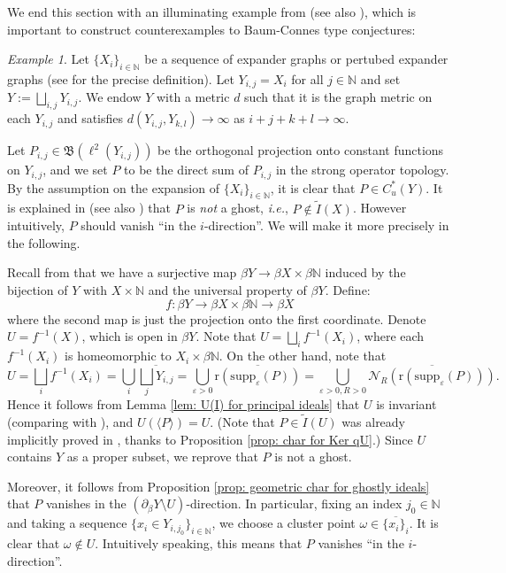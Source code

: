 \documentclass[12pt, a4paper]{amsart}
\numberwithin{equation}{section}
\theoremstyle{definition}
\theoremstyle{remark}
\newtheorem{ex}[thm]{Example}
\def\NN{\mathbb{N}}
\def\Nd{\mathcal{N}}
\def\B{\mathfrak{B}}
\def\supp{\mathrm{supp}}
\def\r{\mathrm{r}}
\begin{document}
We end this section with an illuminating example from \cite[Section 3]{Wan07} (see also \cite[Section 5]{FW14}), which is important to construct counterexamples to Baum-Connes type conjectures:

\begin{ex}\label{ex: Wan07}
Let $\{X_i\}_{i\in \NN}$ be a sequence of expander graphs or pertubed expander graphs (see \cite{Wan07} for the precise definition). Let $Y_{i,j}=X_i$ for all $j\in \NN$ and set $Y:=\bigsqcup_{i,j} Y_{i,j}$. We endow $Y$ with a metric $d$ such that it is the graph metric on each $Y_{i,j}$ and satisfies $d(Y_{i,j}, Y_{k,l}) \to \infty$ as $i+j+k+l \to \infty$.

Let $P_{i,j} \in \B(\ell^2(Y_{i,j}))$ be the orthogonal projection onto constant functions on $Y_{i,j}$, and we set $P$ to be the direct sum of $P_{i,j}$ in the strong operator topology. By the assumption on the expansion of $\{X_i\}_{i\in \NN}$, it is clear that $P \in C^*_u(Y)$. It is explained in \cite[Section 3]{Wan07} (see also \cite[Lemma 5.1]{FW14}) that $P$ is \emph{not} a ghost, \emph{i.e.}, $P \notin \tilde{I}(X)$. However intuitively, $P$ should vanish ``in the $i$-direction''. We will make it more precisely in the following.

Recall from \cite[Section 5.1]{FW14} that we have a surjective map $\beta Y \to \beta X \times \beta \NN$ induced by the bijection of $Y$ with $X \times \NN$ and the universal property of $\beta Y$. Define:
\[
f: \beta Y \longrightarrow \beta X \times \beta \NN \longrightarrow \beta X
\]
where the second map is just the projection onto the first coordinate. Denote $U=f^{-1}(X)$, which is open in $\beta Y$. Note that $U=\bigsqcup_i f^{-1}(X_i)$, where each $f^{-1}(X_i)$ is homeomorphic to $X_i \times \beta \NN$. On the other hand, note that
\[
U= \bigsqcup_i f^{-1}(X_i) = \bigcup_i \overline{\bigsqcup_j Y_{i,j}} = \bigcup_{\varepsilon >0} \overline{\r(\supp_\varepsilon(P))} = \bigcup_{\varepsilon >0, R>0} \overline{\Nd_R(\r(\supp_\varepsilon(P)))}.
\]
Hence it follows from Lemma \ref{lem: U(I) for principal ideals} that $U$ is invariant (comparing with \cite[Lemma 5.2]{FW14}), and $U(\langle P \rangle) = U$. (Note that $P \in \tilde{I}(U)$ was already implicitly proved in \cite[Theorem 5.5]{FW14}, thanks to Proposition \ref{prop: char for Ker qU}.) Since $U$ contains $Y$ as a proper subset, we reprove that $P$ is not a ghost. 

Moreover, it follows from Proposition \ref{prop: geometric char for ghostly ideals} that $P$ vanishes in the $(\partial_\beta Y \setminus U)$-direction. In particular, fixing an index $j_0 \in \NN$ and taking a sequence $\{x_i \in Y_{i,j_0}\}_{i\in \NN}$, we choose a cluster point $\omega \in \overline{\{x_i\}_i}$. It is clear that $\omega \notin U$. Intuitively speaking, this means that $P$ vanishes ``in the $i$-direction''. 


\end{ex}
\end{document}
